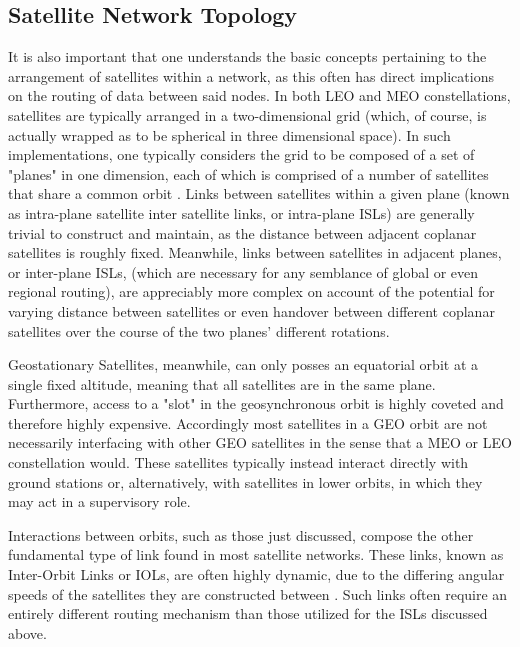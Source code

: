 \subsection{Satellite Network Topology}\label{subsec:satelliteNetworkTopology}
It is also important that one understands the basic concepts pertaining to the arrangement of satellites within a network, as this often has direct implications on the routing of data between said nodes. In both LEO and MEO constellations, satellites are typically arranged in a two-dimensional grid (which, of course, is actually wrapped as to be spherical in three dimensional space). In such implementations, one typically considers the grid to be composed of a set of "planes" in one dimension, each of which is comprised of a number of satellites that share a common orbit \cite{xiaogang_survey_2016}. Links between satellites within a given plane (known as intra-plane satellite inter satellite links, or intra-plane ISLs) are generally trivial to construct and maintain, as the distance between adjacent coplanar satellites is roughly fixed. Meanwhile, links between satellites in adjacent planes, or inter-plane ISLs, (which are necessary for any semblance of global or even regional routing), are appreciably more complex on account of the potential for varying distance between satellites or even handover between different coplanar satellites over the course of the two planes' different rotations.

Geostationary Satellites, meanwhile, can only posses an equatorial orbit at a single fixed altitude, meaning that all satellites are in the same plane. Furthermore, access to a "slot" in the geosynchronous orbit is highly coveted and therefore highly expensive. Accordingly most satellites in a GEO orbit are not necessarily interfacing with other GEO satellites in the sense that a MEO or LEO constellation would. These satellites typically instead interact directly with ground stations or, alternatively, with satellites in lower orbits, in which they may act in a supervisory role.

Interactions between orbits, such as those just discussed, compose the other fundamental type of link found in most satellite networks. These links, known as Inter-Orbit Links or IOLs, are often highly dynamic, due to the differing angular speeds of the satellites they are constructed between \cite{xiaogang_survey_2016}. Such links often require an entirely different routing mechanism than those utilized for the ISLs discussed above.